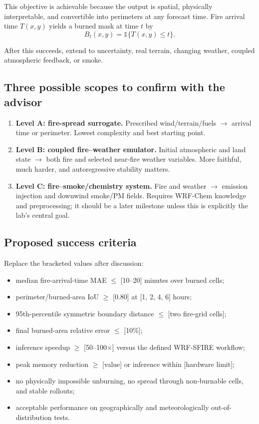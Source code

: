 \documentclass[11pt]{article}
\begin{document}
This objective is achievable because the output is spatial, physically interpretable, and convertible into perimeters at any forecast time. Fire arrival time $T(x,y)$ yields a burned mask at time $t$ by
\begin{equation}
B_t(x,y)=\mathbb{1}\{T(x,y)\le t\}.
\end{equation}

After this succeeds, extend to uncertainty, real terrain, changing weather, coupled atmospheric feedback, or smoke.

\subsection{Three possible scopes to confirm with the advisor}

\begin{enumerate}
  \item \textbf{Level A: fire-spread surrogate.} Prescribed wind/terrain/fuels $\rightarrow$ arrival time or perimeter. Lowest complexity and best starting point.
  \item \textbf{Level B: coupled fire--weather emulator.} Initial atmospheric and land state $\rightarrow$ both fire and selected near-fire weather variables. More faithful, much harder, and autoregressive stability matters.
  \item \textbf{Level C: fire--smoke/chemistry system.} Fire and weather $\rightarrow$ emission injection and downwind smoke/PM fields. Requires WRF-Chem knowledge and preprocessing; it should be a later milestone unless this is explicitly the lab's central goal.
\end{enumerate}

\subsection{Proposed success criteria}

Replace the bracketed values after discussion:
\begin{itemize}
  \item median fire-arrival-time MAE $\le$ [10--20] minutes over burned cells;
  \item perimeter/burned-area IoU $\ge$ [0.80] at [1, 2, 4, 6] hours;
  \item 95th-percentile symmetric boundary distance $\le$ [two fire-grid cells];
  \item final burned-area relative error $\le$ [10\%];
  \item inference speedup $\ge$ [50--100$\times$] versus the defined WRF-SFIRE workflow;
  \item peak memory reduction $\ge$ [value] or inference within [hardware limit];
  \item no physically impossible unburning, no spread through non-burnable cells, and stable rollouts;
  \item acceptable performance on geographically and meteorologically out-of-distribution tests.
\end{itemize}
\end{document}

